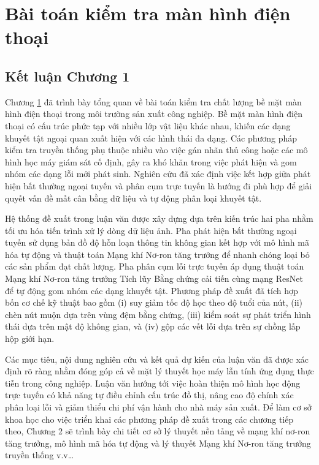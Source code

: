 \chapter{Bài toán kiểm tra màn hình điện thoại}
\label{chap:c1}






\section*{Kết luận Chương 1}

Chương \ref{chap:c1} đã trình bày tổng quan về bài toán kiểm tra chất lượng bề mặt màn hình điện thoại trong môi trường sản xuất công nghiệp. Bề mặt màn hình điện thoại có cấu trúc phức tạp với nhiều lớp vật liệu khác nhau, khiến các dạng khuyết tật ngoại quan xuất hiện với các hình thái đa dạng. Các phương pháp kiểm tra truyền thống phụ thuộc nhiều vào việc gán nhãn thủ công hoặc các mô hình học máy giám sát cố định, gây ra khó khăn trong việc phát hiện và gom nhóm các dạng lỗi mới phát sinh. Nghiên cứu đã xác định việc kết hợp giữa phát hiện bất thường ngoại tuyến và phân cụm trực tuyến là hướng đi phù hợp để giải quyết vấn đề mất cân bằng dữ liệu và tự động phân loại khuyết tật.

Hệ thống đề xuất trong luận văn được xây dựng dựa trên kiến trúc hai pha nhằm tối ưu hóa tiến trình xử lý dòng dữ liệu ảnh. Pha phát hiện bất thường ngoại tuyến sử dụng bản đồ độ hỗn loạn thông tin không gian kết hợp với mô hình mã hóa tự động và thuật toán Mạng khí Nơ-ron tăng trưởng để nhanh chóng loại bỏ các sản phẩm đạt chất lượng. Pha phân cụm lỗi trực tuyến áp dụng thuật toán Mạng khí Nơ-ron tăng trưởng Tích lũy Bằng chứng cải tiến cùng mạng ResNet để tự động gom nhóm các dạng khuyết tật. Phương pháp đề xuất đã tích hợp bốn cơ chế kỹ thuật bao gồm (i) suy giảm tốc độ học theo độ tuổi của nút, (ii) chèn nút muộn dựa trên vùng đệm bằng chứng, (iii) kiểm soát sự phát triển hình thái dựa trên mật độ không gian, và (iv) gộp các vết lỗi dựa trên sự chồng lấp hộp giới hạn.

Các mục tiêu, nội dung nghiên cứu và kết quả dự kiến của luận văn đã được xác định rõ ràng nhằm đóng góp cả về mặt lý thuyết học máy lẫn tính ứng dụng thực tiễn trong công nghiệp. Luận văn hướng tới việc hoàn thiện mô hình học động trực tuyến có khả năng tự điều chỉnh cấu trúc đồ thị, nâng cao độ chính xác phân loại lỗi và giảm thiểu chi phí vận hành cho nhà máy sản xuất. Để làm cơ sở khoa học cho việc triển khai các phương pháp đề xuất trong các chương tiếp theo, Chương 2 sẽ trình bày chi tiết cơ sở lý thuyết nền tảng về mạng khí nơ-ron tăng trưởng, mô hình mã hóa tự động và lý thuyết Mạng khí Nơ-ron tăng trưởng truyền thống v.v…
